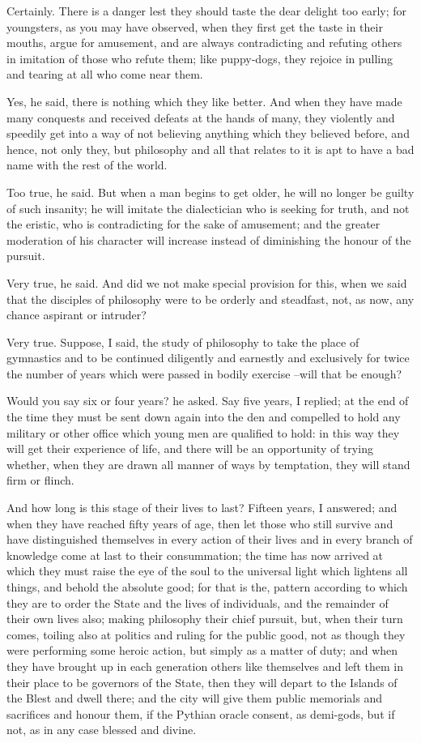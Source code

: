 Certainly.
There is a danger lest they should taste the dear delight too early; for youngsters, as you may have observed, when they first get the taste in their mouths, argue for amusement, and are always contradicting and refuting others in imitation of those who refute them; like puppy-dogs, they rejoice in pulling and tearing at all who come near them.

Yes, he said, there is nothing which they like better.
And when they have made many conquests and received defeats at the hands of many, they violently and speedily get into a way of not believing anything which they believed before, and hence, not only they, but philosophy and all that relates to it is apt to have a bad name with the rest of the world.

Too true, he said.
But when a man begins to get older, he will no longer be guilty of such insanity; he will imitate the dialectician who is seeking for truth, and not the eristic, who is contradicting for the sake of amusement; and the greater moderation of his character will increase instead of diminishing the honour of the pursuit.

Very true, he said.
And did we not make special provision for this, when we said that the disciples of philosophy were to be orderly and steadfast, not, as now, any chance aspirant or intruder?

Very true.
Suppose, I said, the study of philosophy to take the place of gymnastics and to be continued diligently and earnestly and exclusively for twice the number of years which were passed in bodily exercise --will that be enough?

Would you say six or four years? he asked.
Say five years, I replied; at the end of the time they must be sent down again into the den and compelled to hold any military or other office which young men are qualified to hold: in this way they will get their experience of life, and there will be an opportunity of trying whether, when they are drawn all manner of ways by temptation, they will stand firm or flinch.

And how long is this stage of their lives to last?
Fifteen years, I answered; and when they have reached fifty years of age, then let those who still survive and have distinguished themselves in every action of their lives and in every branch of knowledge come at last to their consummation; the time has now arrived at which they must raise the eye of the soul to the universal light which lightens all things, and behold the absolute good; for that is the, pattern according to which they are to order the State and the lives of individuals, and the remainder of their own lives also; making philosophy their chief pursuit, but, when their turn comes, toiling also at politics and ruling for the public good, not as though they were performing some heroic action, but simply as a matter of duty; and when they have brought up in each generation others like themselves and left them in their place to be governors of the State, then they will depart to the Islands of the Blest and dwell there; and the city will give them public memorials and sacrifices and honour them, if the Pythian oracle consent, as demi-gods, but if not, as in any case blessed and divine.


